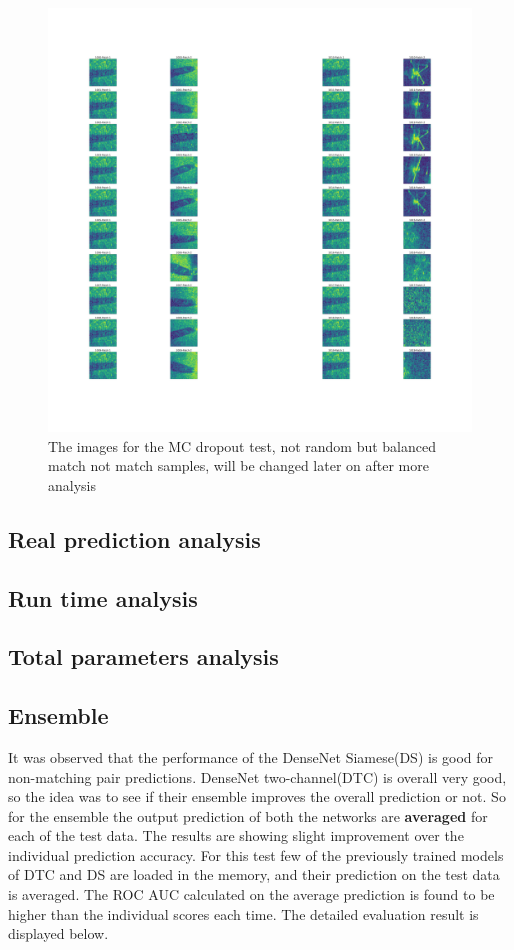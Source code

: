 \begin{figure}[ht]
\centering
\includegraphics[width=16cm]{images/densenet/prediction_images}
\caption{The images for the MC dropout test, not random but balanced match not match samples, will be changed later on after more analysis}
\label{fig:prediction_images}
\end{figure}

\flushbottom
\newpage
\subsection{Real prediction analysis}
\subsection{Run time analysis}
\subsection{Total parameters analysis}
\subsection{Ensemble}
It was observed that the performance of the DenseNet Siamese(DS) is good for non-matching pair predictions. DenseNet two-channel(DTC) is overall very good, so the idea was to see if their ensemble improves the overall prediction or not.
So for the ensemble the output prediction of both the networks are \textbf{averaged} for each of the test data. The results are showing slight improvement over the individual prediction accuracy. For this test few of the previously 
trained models of DTC and DS are loaded in the memory, and their prediction on the test data is averaged. The ROC AUC calculated on the average prediction is found to be higher than the individual scores each time. The detailed 
evaluation result is displayed below.